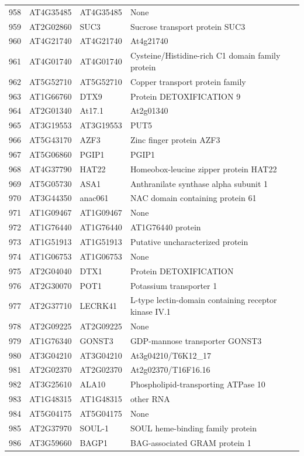 \documentclass[11pt]{article}
\begin{document}
\begin{center}
\begin{tabular}{rlll}
958 & AT4G35485 & AT4G35485 & None\\
959 & AT2G02860 & SUC3 & Sucrose transport protein SUC3\\
960 & AT4G21740 & AT4G21740 & At4g21740\\
961 & AT4G01740 & AT4G01740 & Cysteine/Histidine-rich C1 domain family protein\\
962 & AT5G52710 & AT5G52710 & Copper transport protein family\\
963 & AT1G66760 & DTX9 & Protein DETOXIFICATION 9\\
964 & AT2G01340 & At17.1 & At2g01340\\
965 & AT3G19553 & AT3G19553 & PUT5\\
966 & AT5G43170 & AZF3 & Zinc finger protein AZF3\\
967 & AT5G06860 & PGIP1 & PGIP1\\
968 & AT4G37790 & HAT22 & Homeobox-leucine zipper protein HAT22\\
969 & AT5G05730 & ASA1 & Anthranilate synthase alpha subunit 1\\
970 & AT3G44350 & anac061 & NAC domain containing protein 61\\
971 & AT1G09467 & AT1G09467 & None\\
972 & AT1G76440 & AT1G76440 & AT1G76440 protein\\
973 & AT1G51913 & AT1G51913 & Putative uncharacterized protein\\
974 & AT1G06753 & AT1G06753 & None\\
975 & AT2G04040 & DTX1 & Protein DETOXIFICATION\\
976 & AT2G30070 & POT1 & Potassium transporter 1\\
977 & AT2G37710 & LECRK41 & L-type lectin-domain containing receptor kinase IV.1\\
978 & AT2G09225 & AT2G09225 & None\\
979 & AT1G76340 & GONST3 & GDP-mannose transporter GONST3\\
980 & AT3G04210 & AT3G04210 & At3g04210/T6K12\_17\\
981 & AT2G02370 & AT2G02370 & At2g02370/T16F16.16\\
982 & AT3G25610 & ALA10 & Phospholipid-transporting ATPase 10\\
983 & AT1G48315 & AT1G48315 & other RNA\\
984 & AT5G04175 & AT5G04175 & None\\
985 & AT2G37970 & SOUL-1 & SOUL heme-binding family protein\\
986 & AT3G59660 & BAGP1 & BAG-associated GRAM protein 1\\

\end{tabular}
\end{center}
\end{document}
